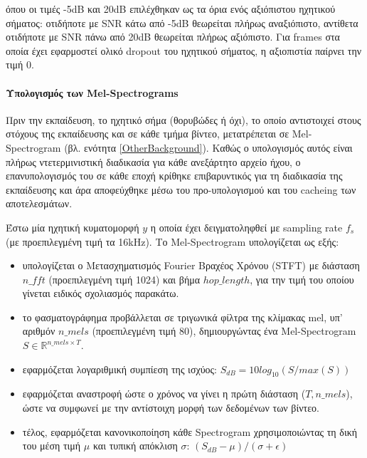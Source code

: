  όπου οι τιμές -5dB και 20dB επιλέχθηκαν ως τα όρια ενός αξιόπιστου ηχητικού σήματος: οτιδήποτε με SNR κάτω από -5dB θεωρείται πλήρως αναξιόπιστο, αντίθετα οτιδήποτε με SNR πάνω από 20dB θεωρείται πλήρως αξιόπιστο. Για frames στα οποία έχει εφαρμοστεί ολικό dropout του ηχητικού σήματος, η αξιοπιστία παίρνει την τιμή 0.
 
 \paragraph{Υπολογισμός των Mel-Spectrograms}
 
 Πριν την εκπαίδευση, το ηχητικό σήμα (θορυβώδες ή όχι), το οποίο αντιστοιχεί στους στόχους της εκπαίδευσης και σε κάθε τμήμα βίντεο, μετατρέπεται σε Mel-Spectrogram (βλ. ενότητα \ref{OtherBackground}). Καθώς ο υπολογισμός αυτός είναι πλήρως ντετερμινιστική διαδικασία για κάθε ανεξάρτητο αρχείο ήχου, ο επανυπολογισμός του σε κάθε εποχή κρίθηκε επιβαρυντικός για τη διαδικασία της εκπαίδευσης και άρα αποφεύχθηκε μέσω του προ-υπολογισμού και του cacheing των αποτελεσμάτων.
 
 Έστω μία ηχητική κυματομορφή $y$ η οποία έχει δειγματοληφθεί με sampling rate $f_s$ (με προεπιλεγμένη τιμή τα 16kHz). Το Mel-Spectrogram υπολογίζεται ως εξής:
 
 \begin{itemize}
 \item υπολογίζεται ο Μετασχηματισμός Fourier Βραχέος Χρόνου (STFT) με διάσταση $n\_fft$ (προεπιλεγμένη τιμή 1024) και βήμα $hop\_length$, για την τιμή του οποίου γίνεται ειδικός σχολιασμός παρακάτω.
 
 \item το φασματογράφημα προβάλλεται σε τριγωνικά φίλτρα της κλίμακας mel, υπ' αριθμόν $n\_mels$ (προεπιλεγμένη τιμή 80), δημιουργώντας ένα Mel-Spectrogram $S \in \mathbb{R}^{n\_mels \times T}$.
 
 \item εφαρμόζεται λογαριθμική συμπίεση της ισχύος: $S_{dB} = 10log_{10}(S/max(S))$
 
 \item εφαρμόζεται αναστροφή ώστε ο χρόνος να γίνει η πρώτη διάσταση ($T, n\_mels$), ώστε να συμφωνεί με την αντίστοιχη μορφή των δεδομένων των βίντεο.
 
 \item τέλος, εφαρμόζεται κανονικοποίηση κάθε Spectrogram χρησιμοποιώντας τη δική του μέση τιμή $\mu$ και τυπική απόκλιση $\sigma$: $(S_{dB} - \mu)/(\sigma + \epsilon)$
 \end{itemize}
 
